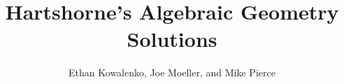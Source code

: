 




\title{Hartshorne's Algebraic Geometry Solutions}
\author{Ethan Kowalenko, Joe Moeller, and Mike Pierce}
\date{}



\maketitle







